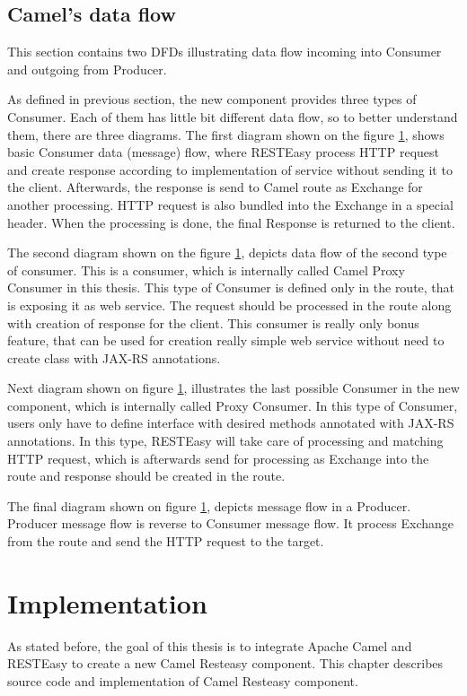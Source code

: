 \documentclass[12pt,final,oneside]{fithesis2}
\begin{document}
\section{Camel's data flow}
This section contains two DFDs illustrating data flow incoming into Consumer and outgoing from Producer. 

As defined in previous section, the new component provides three types of Consumer. Each of them has little bit different data flow, so to better understand them, there are three diagrams. The first diagram shown on the figure \ref{}, shows basic Consumer data (message) flow, where RESTEasy process HTTP request and create response according to implementation of service without sending it to the client. Afterwards, the response is send to Camel route as Exchange for another processing. HTTP request is also bundled into the Exchange in a special header. When the processing  is done, the final Response is returned to the client. 

The second diagram shown on the figure \ref{}, depicts data flow of the second type of consumer. This is a consumer, which is internally called Camel Proxy Consumer in this thesis. This type of Consumer is defined only in the route, that is exposing it as web service. The request should be processed in the route along with creation of response for the client. This consumer is really only bonus feature, that can be used for creation really simple web service without need to create class with JAX-RS annotations. 

Next diagram shown on figure \ref{}, illustrates the last possible Consumer in the new component, which is internally called Proxy Consumer. In this type of Consumer, users only have to define interface with desired methods annotated with JAX-RS annotations. In this type, RESTEasy will take care of processing and matching HTTP request, which is afterwards send for processing as Exchange into the route and response should be created in the route.  


The final diagram shown on figure \ref{}, depicts message flow in a Producer. Producer message flow is reverse to Consumer message flow. It process Exchange from the route and send the HTTP request to the target. 


\chapter{Implementation}\label{impl}
As stated before, the goal of this thesis is to integrate Apache Camel and RESTEasy to create a new Camel Resteasy component. This chapter describes source code and implementation of Camel Resteasy component. 
\end{document}
